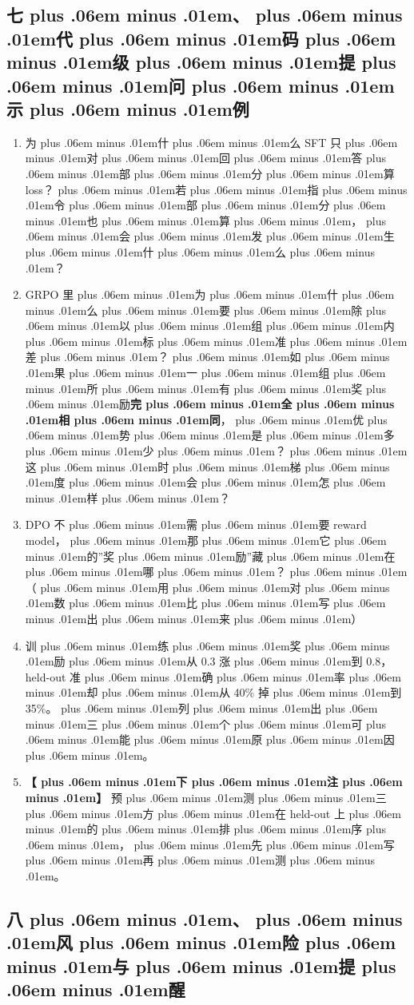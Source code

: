 \documentclass[
]{article}
\providecommand{\tightlist}{%
  \setlength{\itemsep}{0pt}\setlength{\parskip}{0pt}}
\def\zh#1{{\zhfont #1}}
\def\zhglue{\hskip0pt plus .06em minus .01em}
\begin{document}
\subsection{\zh{七\zhglue 、\zhglue 代\zhglue 码\zhglue 级\zhglue 提\zhglue 问\zhglue 示\zhglue 例}}\label{ux4e03ux4ee3ux7801ux7ea7ux63d0ux95eeux793aux4f8b}

\begin{enumerate}
\def\labelenumi{\arabic{enumi}.}
\tightlist
\item
  \zh{为\zhglue 什\zhglue 么} SFT \zh{只\zhglue 对\zhglue 回\zhglue 答\zhglue 部\zhglue 分\zhglue 算} loss\zh{？\zhglue 若\zhglue 指\zhglue 令\zhglue 部\zhglue 分\zhglue 也\zhglue 算\zhglue ，\zhglue 会\zhglue 发\zhglue 生\zhglue 什\zhglue 么\zhglue ？}
\item
  GRPO \zh{里\zhglue 为\zhglue 什\zhglue 么\zhglue 要\zhglue 除\zhglue 以\zhglue 组\zhglue 内\zhglue 标\zhglue 准\zhglue 差\zhglue ？\zhglue 如\zhglue 果\zhglue 一\zhglue 组\zhglue 所\zhglue 有\zhglue 奖\zhglue 励}\textbf{\zh{完\zhglue 全\zhglue 相\zhglue 同}}\zh{，\zhglue 优\zhglue 势\zhglue 是\zhglue 多\zhglue 少\zhglue ？\zhglue 这\zhglue 时\zhglue 梯\zhglue 度\zhglue 会\zhglue 怎\zhglue 样\zhglue ？}
\item
  DPO \zh{不\zhglue 需\zhglue 要} reward model\zh{，\zhglue 那\zhglue 它\zhglue 的}''\zh{奖\zhglue 励}''\zh{藏\zhglue 在\zhglue 哪\zhglue ？\zhglue （\zhglue 用\zhglue 对\zhglue 数\zhglue 比\zhglue 写\zhglue 出\zhglue 来\zhglue ）}
\item
  \zh{训\zhglue 练\zhglue 奖\zhglue 励\zhglue 从} 0.3 \zh{涨\zhglue 到} 0.8\zh{，}held-out \zh{准\zhglue 确\zhglue 率\zhglue 却\zhglue 从} 40\% \zh{掉\zhglue 到} 35\%\zh{。\zhglue 列\zhglue 出\zhglue 三\zhglue 个\zhglue 可\zhglue 能\zhglue 原\zhglue 因\zhglue 。}
\item
  \textbf{\zh{【\zhglue 下\zhglue 注\zhglue 】}} \zh{预\zhglue 测\zhglue 三\zhglue 方\zhglue 在} held-out \zh{上\zhglue 的\zhglue 排\zhglue 序\zhglue ，\zhglue 先\zhglue 写\zhglue 再\zhglue 测\zhglue 。}
\end{enumerate}

\subsection{\zh{八\zhglue 、\zhglue 风\zhglue 险\zhglue 与\zhglue 提\zhglue 醒}}\label{ux516bux98ceux9669ux4e0eux63d0ux9192}
\end{document}
